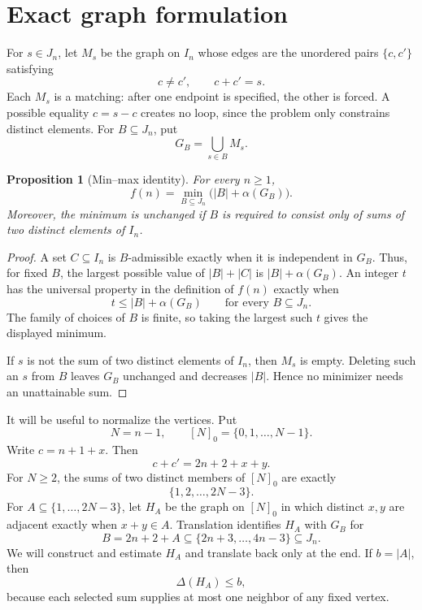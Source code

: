 \documentclass[11pt]{article}
\numberwithin{equation}{section}
\newtheorem{proposition}[theorem]{Proposition}
\theoremstyle{definition}
\theoremstyle{remark}
\begin{document}
\section{Exact graph formulation}\label{sec:graph}

For $s\in J_n$, let $M_s$ be the graph on $I_n$ whose edges are the
unordered pairs $\{c,c'\}$ satisfying
\[
 c\ne c',\qquad c+c'=s.
\]
Each $M_s$ is a matching: after one endpoint is specified, the other is
forced.  A possible equality $c=s-c$ creates no loop, since the problem
only constrains distinct elements.  For $B\subseteq J_n$, put
\[
 G_B=\bigcup_{s\in B}M_s.
\]

\begin{proposition}[Min--max identity]\label{prop:minmax}
For every $n\ge1$,
\[
 \boxed{\displaystyle
 f(n)=\min_{B\subseteq J_n}\bigl(|B|+\alpha(G_B)\bigr).}
\]
Moreover, the minimum is unchanged if $B$ is required to consist only
of sums of two distinct elements of $I_n$.
\end{proposition}

\begin{proof}
A set $C\subseteq I_n$ is $B$-admissible exactly when it is independent
in $G_B$.  Thus, for fixed $B$, the largest possible value of
$|B|+|C|$ is $|B|+\alpha(G_B)$.  An integer $t$ has the universal
property in the definition of $f(n)$ exactly when
\[
 t\le |B|+\alpha(G_B)\qquad\text{for every }B\subseteq J_n.
\]
The family of choices of $B$ is finite, so taking the largest such $t$
gives the displayed minimum.

If $s$ is not the sum of two distinct elements of $I_n$, then $M_s$ is
empty.  Deleting such an $s$ from $B$ leaves $G_B$ unchanged and decreases
$|B|$.  Hence no minimizer needs an unattainable sum.
\end{proof}

It will be useful to normalize the vertices.  Put
\[
 N=n-1,\qquad [N]_0=\{0,1,\ldots,N-1\}.
\]
Write $c=n+1+x$.  Then
\[
 c+c'=2n+2+x+y.
\]
For $N\ge2$, the sums of two distinct members of $[N]_0$ are exactly
\[
 \{1,2,\ldots,2N-3\}.
\]
For $A\subseteq\{1,\ldots,2N-3\}$, let $H_A$ be the graph on $[N]_0$
in which distinct $x,y$ are adjacent exactly when $x+y\in A$.  Translation
identifies $H_A$ with $G_B$ for
\[
 B=2n+2+A\subseteq\{2n+3,\ldots,4n-3\}\subseteq J_n.
\]
We will construct and estimate $H_A$ and translate back only at the end.
If $b=|A|$, then
\begin{equation}\label{eq:max-degree}
 \Delta(H_A)\le b,
\end{equation}
because each selected sum supplies at most one neighbor of any fixed
vertex.
\end{document}
